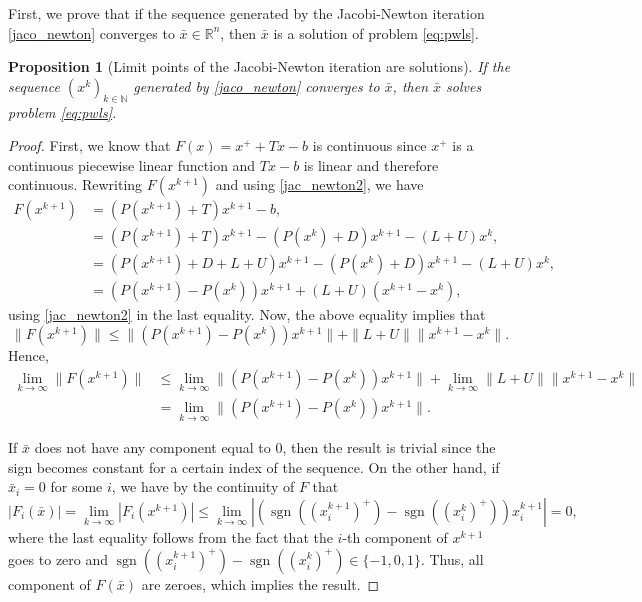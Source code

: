 \documentclass[11pt]{article}
\newtheorem{proposition}{Proposition}[section]
\DeclareMathOperator{\sgn}{sgn}
\newcommand{\R}{\mathbb R}
\newcommand{\NN}{\mathbb{N}}
\begin{document}
First, we prove that if the sequence generated by the Jacobi-Newton iteration \eqref{jaco_newton} converges to $\bar x\in\R^n$, then $\bar x$ is a solution of problem \eqref{eq:pwls}.

\begin{proposition}[Limit points of the Jacobi-Newton iteration are solutions]\label{conv-jacobi}
If the sequence $(x^{k})_{k\in\NN}$ generated by \eqref{jaco_newton} converges to $\bar x$, then $\bar x$ solves problem \eqref{eq:pwls}.
\end{proposition}
\begin{proof}
First, we know that $F(x) = x^+ + Tx -b$ is continuous since $x^+$ is a continuous piecewise linear function and $Tx-b$ is linear and therefore continuous. Rewriting $F(x^{k+1})$ and using \eqref{jac_newton2}, we have
\begin{align*}
F(x^{k+1}) &= (P(x^{k+1})+T)x^{k+1}-b,\\
&= (P(x^{k+1})+T)x^{k+1}-(P(x^{k})+D)x^{k+1}-(L+U)x^{k},\\
&= (P(x^{k+1})+D+L+U)x^{k+1}-(P(x^{k})+D)x^{k+1}-(L+U)x^{k},\\
&= (P(x^{k+1})-P(x^{k}))x^{k+1}+(L+U)(x^{k+1}-x^{k}),
\end{align*} using \eqref{jac_newton2} in the last equality. Now, the above equality implies that
$$\|F(x^{k+1})\| \leq \|(P(x^{k+1})-P(x^{k}))x^{k+1}\|+\|L+U\|\|x^{k+1}-x^{k}\|.$$
Hence,
\begin{align*}
\lim_{k \to \infty} \|F(x^{k+1})\| &\leq \lim_{k \to \infty} \|(P(x^{k+1})-P(x^{k}))x^{k+1}\| + \lim_{k \to \infty} \|L+U\|\|x^{k+1}-x^{k}\|\\
&= \lim_{k \to \infty} \|(P(x^{k+1})-P(x^{k}))x^{k+1}\|.
\end{align*}

If $\bar x$ does not have any component equal to $0$, then the result is trivial since the sign becomes constant for a certain index of the sequence. On the other hand, if $\bar x_i = 0$ for some $i$, we have by the continuity of $F$ that
$$ |F_i(\bar x)| = \lim_{k \to \infty} |F_i(x^{k+1})| \leq \lim_{k \to \infty} |(\sgn((x^{k+1}_i)^+)-\sgn((x^{k}_i)^+))x^{k+1}_i| = 0, $$ where the last equality follows from the fact that the $i$-th component of $x^{k+1}$ goes to zero and $\sgn((x^{k+1}_i)^+)-\sgn((x^{k}_i)^+) \in \{-1,0,1\}$. Thus, all component of $F(\bar x)$ are zeroes, which implies the result. 
\end{proof}
\end{document}
